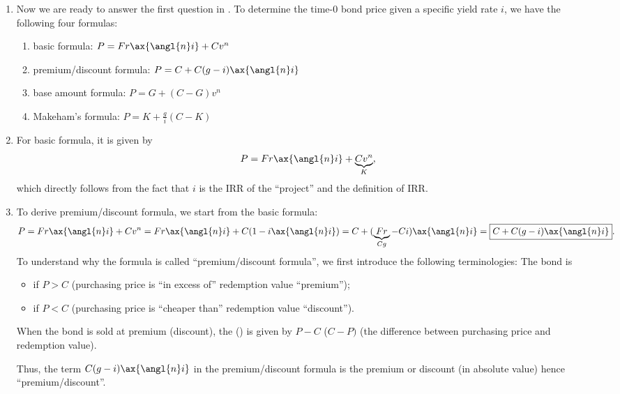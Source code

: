 \begin{enumerate}
\begin{center}
\end{center}
\item Now we are ready to answer the first question in
. To determine the time-0 bond price given a
specific yield rate \(i\), we have the following four formulas:
\begin{enumerate}
\item basic formula: \(P=Fr\ax{\angl{n}i}+Cv^n\)
\item premium/discount formula: \(P=C+C(g-i)\ax{\angl{n}i}\)
\item base amount formula: \(P=G+(C-G)v^n\)
\item Makeham's formula: \(\displaystyle P=K+\frac{g}{i}(C-K)\)
\end{enumerate}
\item \label{it:bond-basic-fmla}
For basic formula, it is given by
\[
P=Fr\ax{\angl{n}i}+\underbrace{Cv^n}_{K},
\]
which directly follows from the fact that \(i\) is the IRR of the ``project''
and the definition of IRR.

\item \label{it:bond-prem-disc-fmla}
To derive premium/discount formula, we start from the basic formula:
\[
P=Fr\ax{\angl{n}i}+Cv^n
=Fr\ax{\angl{n}i}+C(1-i\ax{\angl{n}i})
=C+(\underbrace{Fr}_{Cg}-Ci)\ax{\angl{n}i}
=\boxed{C+C(g-i)\ax{\angl{n}i}}.
\]
To understand why the formula is called ``premium/discount formula'', we first
introduce the following terminologies: The bond is
\begin{itemize}
\item {} if \(P>C\) (purchasing price is ``in excess of'' redemption value  ``premium'');
\item {} if \(P<C\) (purchasing price is ``cheaper than'' redemption value  ``discount'').
\end{itemize}
When the bond is sold at premium (discount), the 
() is given by \(P-C\) (\(C-P)\) (the difference between
purchasing price and redemption value).

Thus, the term \(C(g-i)\ax{\angl{n}i}\) in the premium/discount formula is the
premium or discount (in absolute value)  hence
``premium/discount''.


\end{enumerate}
